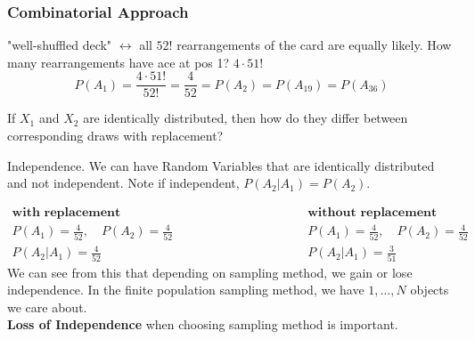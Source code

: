 \subsubsection*{Combinatorial Approach}
"well-shuffled deck" $\leftrightarrow$ all $52!$ rearrangements of the card are equally likely. How many rearrangements have ace at pos 1? \underline{$4 \cdot 51!$}
\begin{equation*}
	P(A_1) = \frac{4 \cdot 51!}{52!} = \frac{4}{52} = P(A_2) = P(A_{19}) = P(A_{36})
\end{equation*}
\begin{question}
	If $X_1$ and $X_2$ are identically distributed, then how do they differ between corresponding draws with replacement?
\end{question} 
\begin{answer}
	Independence. We can have Random Variables that are identically distributed and not independent. Note if independent, $P(A_2 |A_1) = P(A_2)$.
\end{answer}
\begin{equation*}
	\begin{split}
		\textbf{with replacement}\\
		P(A_1) = \frac{4}{52}, \quad
		P(A_2) = \frac{4}{52}\\
		P(A_2 | A_1) = \frac{4}{52}
	\end{split} \hspace{10em}
	\begin{split}
		\textbf{without replacement}\\
		P(A_1) = \frac{4}{52}, \quad
		P(A_2) = \frac{4}{52}\\
		P(A_2 | A_1) = \frac{3}{51}
	\end{split}
\end{equation*}
We can see from this that depending on sampling method, we gain or lose independence. In the finite population sampling method, we have $1, \ldots, N$ objects we care about. \\
\textbf{Loss of Independence} when choosing sampling method is important. 